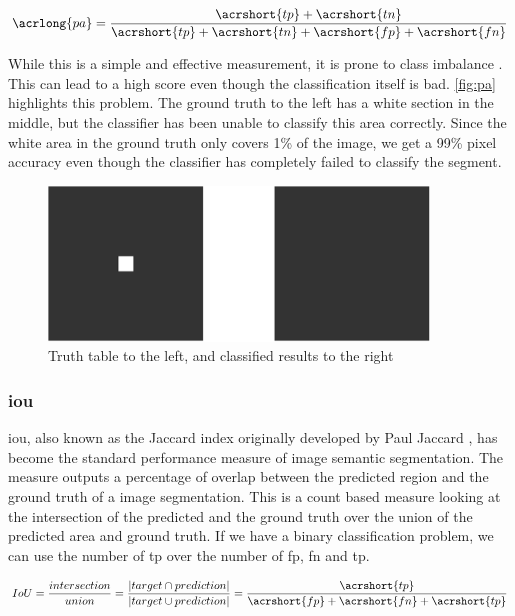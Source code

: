\begin{equation}
    \acrlong{pa} = \frac{\acrshort{tp}+\acrshort{tn}}{\acrshort{tp}+\acrshort{tn}+\acrshort{fp}+\acrshort{fn}}
\end{equation}

While this is a simple and effective measurement, it is prone to class imbalance \cite{tiu}. This can lead to a high score even though the classification itself is bad. \autoref{fig:pa} highlights this problem. The ground truth to the left has a white section in the middle, but the classifier has been unable to classify this area correctly. Since the white area in the ground truth only covers 1\% of the image, we get a 99\% pixel accuracy even though the classifier has completely failed to classify the segment.

\begin{figure}[H]
  \centering
  \includegraphics[width=0.9\textwidth]{img/objective_measures/pa.pdf}
  \caption{Truth table to the left, and classified results to the right}
  \label{fig:pa}
\end{figure}

\subsubsection{\acrlong{iou}}
\acrfull{iou}, also known as the Jaccard index originally developed by Paul Jaccard \cite{jaccard}, has become the standard performance measure of image semantic segmentation\cite{Rezatofighi_2019_CVPR}. The measure outputs a percentage of overlap between the predicted region and the ground truth of a image segmentation. This is a count based measure looking at the intersection of the predicted and the ground truth over the union of the predicted area and ground truth. If we have a binary classification problem, we can use the number of \acrlong{tp} over the number of \acrlong{fp}, \acrlong{fn} and \acrlong{tp}.
\cite{10.1007/978-3-319-50835-1_22}

\begin{equation}
    IoU = \frac{intersection}{union} = \frac{|target \cap prediction|}{|target \cup prediction|} = \frac{\acrshort{tp}}{\acrshort{fp} + \acrshort{fn} + \acrshort{tp}}
\end{equation}


